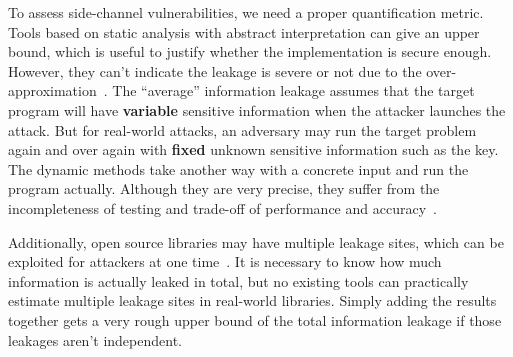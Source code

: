 To assess side-channel vulnerabilities, we need a proper quantification metric.
Tools based on static analysis with abstract interpretation can give an upper bound, 
which is useful to justify whether the implementation is secure enough. 
However, they can’t indicate the leakage is severe or not due to the over-approximation~\cite{}. 
The ``average'' information leakage assumes that the target program will have \textbf{variable} sensitive 
information when the attacker launches the attack.
But for real-world attacks, an adversary may run the target problem again and over again 
with \textbf{fixed} unknown sensitive information such as the key.
The dynamic methods take another way with a concrete input and run the program actually. 
Although they are very precise, they suffer from the incompleteness of testing 
and trade-off of performance and accuracy~\cite{}.

Additionally, open source libraries may have multiple leakage sites, which can be exploited for attackers
at one time~\cite{191010,7163052,hornby2011side}. 
It is necessary to know how much information is actually leaked in total, 
but no existing tools can practically estimate multiple leakage sites in real-world libraries.
Simply adding the results together gets a very rough upper bound of the total information leakage if those 
leakages aren’t independent. 

